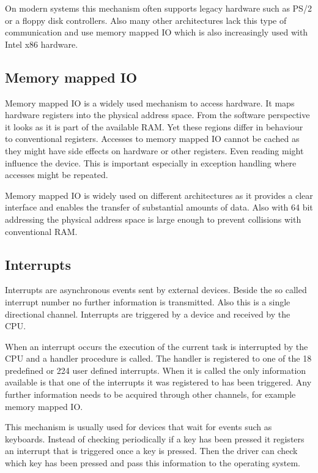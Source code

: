 \documentclass[
a4paper,
12pt,
notitlepage,
parskip=half,
DIV=11,
]{scrbook}
\begin{document}
		On modern systems this mechanism often supports legacy hardware such as PS/2 or a floppy disk controllers.
		Also many other architectures lack this type of communication and use memory mapped IO which is also increasingly used with Intel x86 hardware.
		\citep{ioports} \citep{intelmanual}
		
		\subsection{Memory mapped IO}
		
		Memory mapped IO is a widely used mechanism to access hardware.
		It maps hardware registers into the physical address space.
		From the software perspective it looks as it is part of the available RAM.
		Yet these regions differ in behaviour to conventional registers.
		Accesses to memory mapped IO cannot be cached as they might have side effects on hardware or other registers.
		Even reading might influence the device.
		This is important especially in exception handling where accesses might be repeated.
		
		Memory mapped IO is widely used on different architectures as it provides a clear interface and enables the transfer of substantial amounts of data.
		Also with 64 bit addressing the physical address space is large enough to prevent collisions with conventional RAM.
		\citep{intelmanual}
		
		\subsection{Interrupts}
		
		Interrupts are asynchronous events sent by external devices.
		Beside the so called interrupt number no further information is transmitted.
		Also this is a single directional channel.
		Interrupts are triggered by a device and received by the CPU.
		
		When an interrupt occurs the execution of the current task is interrupted by the CPU and a handler procedure is called.
		The handler is registered to one of the 18 predefined or 224 user defined interrupts.
		When it is called the only information available is that one of the interrupts it was registered to has been triggered.
		Any further information needs to be acquired through other channels, for example memory mapped IO. \citep{intelmanual}
		
		This mechanism is usually used for devices that wait for events such as keyboards.
		Instead of checking periodically if a key has been pressed it registers an interrupt that is triggered once a key is pressed.
		Then the driver can check which key has been pressed and pass this information to the operating system.
		
\end{document}
